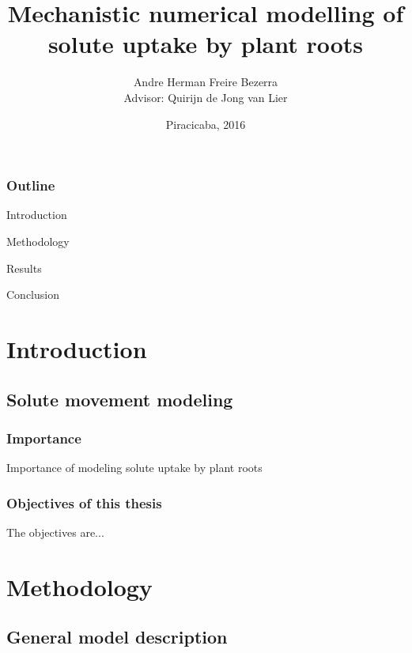 \documentclass[compress]{beamer}  %
\title{Mechanistic numerical modelling of solute uptake by plant roots}
\author[Bezerra, A.H.F.]
{
Andre Herman Freire Bezerra\\
{\scriptsize Advisor: Quirijn de Jong van Lier}
}
\institute{University of S\~ao Paulo}
\date
{Piracicaba, 2016}
\begin{document}
\frame{\titlepage}

\begin{frame}
\frametitle{Outline}
Introduction

Methodology

Results

Conclusion
\end{frame}

\section{Introduction}
\subsection{Solute movement modeling}
\begin{frame}
\frametitle{Importance}
Importance of modeling solute uptake by plant roots
\end{frame}
\begin{frame}
\frametitle{Objectives of this thesis}
The objectives are...
\end{frame}

\section{Methodology}
\subsection{General model description}
\end{document}
